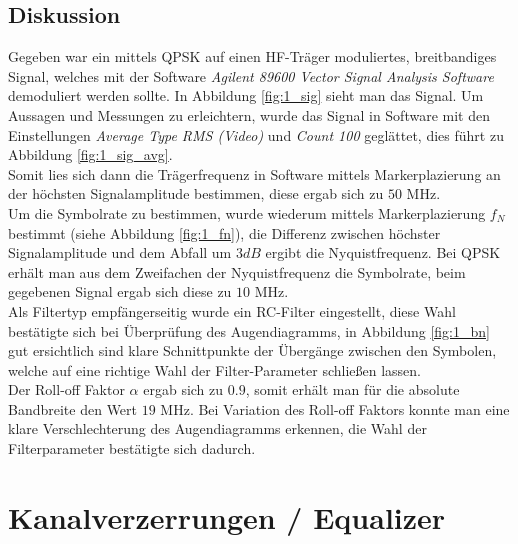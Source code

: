 \documentclass[12pt,a4paper,ngerman]{article}
\begin{document}
\subsection{Diskussion}
Gegeben war ein mittels QPSK auf einen HF-Träger moduliertes, breitbandiges Signal, welches mit der Software \textit{Agilent 89600 Vector Signal Analysis Software} demoduliert werden sollte. In Abbildung \ref{fig:1_sig} sieht man das Signal. Um Aussagen und Messungen zu erleichtern, wurde das Signal in Software mit den Einstellungen \textit{Average Type RMS (Video)} und \textit{Count 100} \cite[23]{skript} geglättet, dies führt zu Abbildung \ref{fig:1_sig_avg}. \\
Somit lies sich dann die Trägerfrequenz in Software mittels Markerplazierung an der höchsten Signalamplitude bestimmen, diese ergab sich zu $50$ MHz.\\ Um die Symbolrate zu bestimmen, wurde wiederum mittels Markerplazierung $f_N$ bestimmt (siehe Abbildung \ref{fig:1_fn}), die Differenz zwischen höchster Signalamplitude und dem Abfall um $3dB$ ergibt die Nyquistfrequenz. Bei QPSK erhält man aus dem Zweifachen der Nyquistfrequenz die Symbolrate, beim gegebenen Signal ergab sich diese zu $10$ MHz. \\
Als Filtertyp empfängerseitig wurde ein RC-Filter eingestellt, diese Wahl bestätigte sich bei Überprüfung des Augendiagramms, in Abbildung \ref{fig:1_bn} gut ersichtlich sind klare Schnittpunkte der Übergänge zwischen den Symbolen, welche auf eine richtige Wahl der Filter-Parameter schließen lassen. \\ 
Der Roll-off Faktor $\alpha$ ergab sich zu $0.9$, somit erhält man für die absolute Bandbreite den Wert $19$ MHz. Bei Variation des Roll-off Faktors konnte man eine klare Verschlechterung des Augendiagramms erkennen, die Wahl der Filterparameter bestätigte sich dadurch.


\pagebreak



\section{Kanalverzerrungen / Equalizer}
\end{document}
